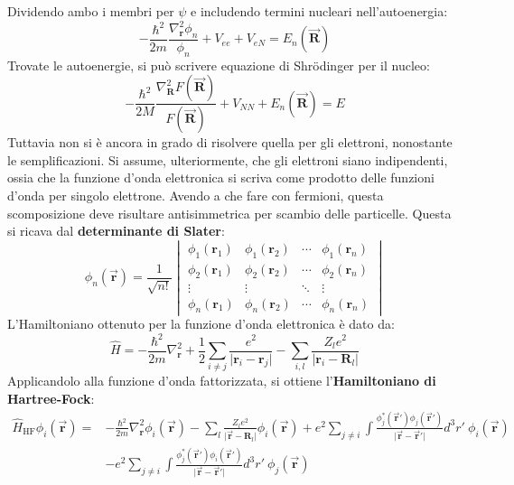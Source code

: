 \documentclass[10pt, a4paper]{scrartcl}
\numberwithin{equation}{subsection}
\theoremstyle{style1}
\begin{document}
Dividendo ambo i membri per $\psi $ e includendo termini nucleari nell'autoenergia:
\begin{equation}
-\frac{\hbar ^2}{2m}\frac{\nabla ^2 _\mathbf{r} \phi _n}{\phi _n} + V_{ee}  + V_{eN} = E_n(\vec{\mathbf{R} })
\end{equation}
Trovate le autoenergie, si pu\`o scrivere equazione di Shr\"odinger per il nucleo:
\begin{equation}
	-\frac{\hbar ^2}{2M} \frac{\nabla ^2 _\mathbf{R} F(\vec{\mathbf{R} })}{F(\vec{\mathbf{R} })} + V_{N N } + E_n(\vec{\mathbf{R} }) = E
\end{equation}
Tuttavia non si è ancora in grado di risolvere quella per gli elettroni, nonostante le semplificazioni.
Si assume, ulteriormente, che gli elettroni siano indipendenti, ossia che la funzione d'onda elettronica si scriva come prodotto delle funzioni d'onda per singolo elettrone.
Avendo a che fare con fermioni, questa scomposizione deve risultare antisimmetrica per scambio delle particelle. 
Questa si ricava dal \textbf{determinante di Slater}:
\begin{equation}
	\phi _n (\vec{\mathbf{r} }) = \frac{1}{\sqrt{n!} } \begin{vmatrix} \phi _1(\mathbf{r} _1) & \phi _1(\mathbf{r} _2) & \cdots & \phi _1 (\mathbf{r} _n) \\ 
	\phi_2 (\mathbf{r}_1 )& \phi _2 ( \mathbf{r} _2) & \cdots & \phi _2 (\mathbf{r} _n)\\
	\vdots & \vdots& \ddots & \vdots\\
\phi _n (\mathbf{r} _1) & \phi _n (\mathbf{r} _2) & \cdots &\phi _n(\mathbf{r} _n)\end{vmatrix} 
\end{equation}
L'Hamiltoniano ottenuto per la funzione d'onda elettronica \`e dato da:
\begin{equation}
	\hat{H} = -\frac{\hbar^2}{2m} \nabla ^2_\mathbf{r}  + \frac{1}{2}\sum_{i\neq j}^{} \frac{e^2}{\lvert \mathbf{r} _i - \mathbf{r} _j \rvert } - \sum_{i,l}^{} \frac{Z_l e^2}{\lvert \mathbf{r} _i - \mathbf{R} _l \rvert }
\end{equation}
Applicandolo alla funzione d'onda fattorizzata, si ottiene l'\textbf{Hamiltoniano di Hartree-Fock}:
\begin{equation}
	\begin{split}
		\hat{H}_\text{HF} \phi _i (\vec{\mathbf{r} } ) = &- \frac{\hbar ^2}{2m} \nabla _\mathbf{r} ^2 \phi _i(\vec{\mathbf{r} })-\sum_{l}^{} \frac{Z_l e^2}{\lvert \vec{\mathbf{r} } - \mathbf{R} _l \rvert } \phi _i (\vec{\mathbf{r} }) + e^2 \sum_{j\neq i }^{} \int \frac{\phi _j^*(\vec{\mathbf{r} }') \phi _j(\vec{\mathbf{r} }')}{\lvert \vec{\mathbf{r} }-\vec{\mathbf{r} }' \rvert } d^3 r' \ \phi _i (\vec{\mathbf{r} })\\
							   &-e^2 \sum_{j\neq i}^{} \int \frac{\phi _j^*(\vec{\mathbf{r} }') \phi _i (\vec{\mathbf{r} }')}{\lvert \vec{\mathbf{r} }- \vec{\mathbf{r} }' \rvert } d^3 r' \ \phi _j (\vec{\mathbf{r} })
	\end{split}
\end{equation}
\end{document}
